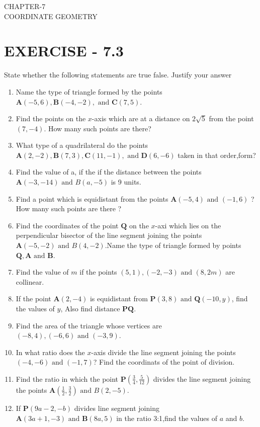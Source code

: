 \documentclass[12pt]{article}
\providecommand{\brak}[1]{\ensuremath{\left(#1\right)}}
\let\vec\mathbf
\begin{document}
\begin{center}
\textbf\large{CHAPTER-7 \\ COORDINATE GEOMETRY}
\end{center}

\section*{EXERCISE - 7.3}
State whether the following statements are true false. Justify your answer
\begin{enumerate}\item Name the type of triangle formed by the points $\vec{A}(-5,6),\vec{B}(-4,-2),\text{ and }\vec{C}(7,5)$.
\item Find the points on the $x$-axis which are at a distance on $2\sqrt{5}$ from the point$ (7,-4).$ How many such points are there?
\item What type of a quadrilateral do the points $\vec{A}(2,-2),\vec{B}(7,3),\vec{C}(11,-1),\text{ and }\vec{D}(6,-6)$ taken in that order,form?
\item Find the value of a, if the if the distance between the points $\vec{A}(-3,-14) \text{ and }{B}(a,-5)$ is 9 units.
\item Find a point which is equidistant from the points $\vec{A}(-5,4) \text{ and }(-1,6)$ ? How many such points are there ?
\item Find the coordinates of the point $\vec{Q}$ on the $x$-axi which lies on the perpendicular bisector of the line segment joining the points $\vec{A}(-5,-2) \text{ and }{B}(4,-2)$.Name the type of triangle formed by points $\vec{Q},\vec{A}\text{ and }\vec{B}$.
\item Find the value of $m$ if the points $(5,1),(-2,-3) \text{ and }(8,2m)$ are collinear.
\item If the point $\vec{A}(2,-4)$ is equidistant from $\vec{P}(3,8) \text{ and }\vec{Q}(-10,y)$, find the values of $y$, Also find distance $\vec{PQ}$.
\item Find the area of the triangle whose vertices are $(-8,4),(-6,6)\text{ and }(-3,9)$.
\item In what ratio does the $x$-axis divide the line segment joining the points $(-4,-6)\text{ and }(-1,7)$? Find the coordinats of the point of division.
\item Find the ratio in which the point $\vec{P}\brak{\frac{3}{4},\frac{5}{12}}$ divides the line segment joining the points $\vec{A}\brak{\frac{1}{2},\frac{3}{2}}\text{ and }{B}(2,-5)$.
\item If $\vec{P}(9a-2,-b)$ divides line segment joining $\vec{A}(3a+1,-3)\text{ and }\vec{B}(8a,5)$ in the ratio 3:1,find the values of $a$ and $b$.

\end{enumerate}
\end{document}
